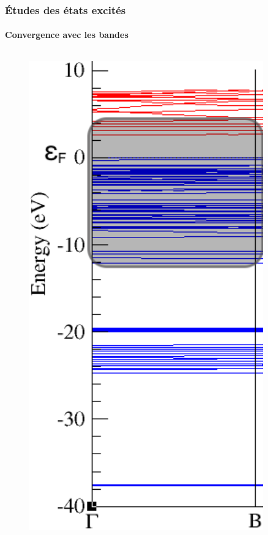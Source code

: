 \documentclass[french]{beamer}
\begin{document}
\begin{frame}
\frametitle{Études des états excités}
\framesubtitle{Convergence avec les bandes}
\begin{columns}
  \begin{column}{\paperwidth-10pt}
    \begin{figure}[!h]
    \centering
    \vspace{10pt}
    \includegraphics[width=0.9\textwidth]{band_structure_1}

\end{figure}
\end{column}
\end{columns}
\end{frame}
\end{document}
